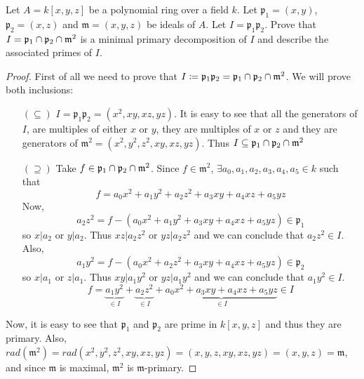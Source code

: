 \begin{problem}
    Let $A = k[x,y,z]$ be a polynomial ring over a field $k$.
    Let $\mathfrak{p}_1 = (x,y)$, $\mathfrak{p}_2 = (x,z)$ and $\mathfrak{m} = (x,y,z)$ be ideals of $A$.
    Let $I = \mathfrak{p}_1 \mathfrak{p}_2$.
    Prove that $I = \mathfrak{p}_1 \cap \mathfrak{p}_2 \cap \mathfrak{m}^2$ is a minimal primary decomposition of $I$ and describe the associated primes of $I$.
    \begin{sol}
        \begin{proof}
            First of all we need to prove that $I \coloneqq \mathfrak{p}_1 \mathfrak{p}_2 = \mathfrak{p}_1 \cap \mathfrak{p}_2 \cap \mathfrak{m}^2$.
            We will prove both inclusions:
            \begin{itemize}
                \item[$(\subseteq)$]
                $I = \mathfrak{p}_1 \mathfrak{p}_2 = (x^2, xy, xz, yz)$.
                It is easy to see that all the generators of $I$, are multiples of either $x$ or $y$, they are multiples of $x$ or $z$ and they are generators of $\mathfrak{m}^2 = (x^2, y^2, z^2, xy, xz, yz)$.
                Thus $I \subseteq \mathfrak{p}_1 \cap \mathfrak{p}_2 \cap \mathfrak{m}^2$
                \item[$(\supseteq)$]
                Take $f \in \mathfrak{p}_1 \cap \mathfrak{p}_2 \cap \mathfrak{m}^2$.
                Since $f \in \mathfrak{m}^2$, $\exists a_0, a_1, a_2, a_3, a_4, a_5 \in k$ such that
                \[ f = a_0 x^2 + a_1 y^2 + a_2 z^2 + a_3 xy + a_4 xz + a_5 yz \]
                Now,
                \[ a_2 z^2 = f - (a_0 x^2 + a_1 y^2 + a_3 xy + a_4 xz + a_5 yz) \in \mathfrak{p}_1 \]
                so $x | a_2$ or $y | a_2$.
                Thus $xz | a_2 z^2$ or $yz | a_2 z^2$ and we can conclude that $a_2 z^2 \in I$.
                Also,
                \[ a_1 y^2 = f - (a_0 x^2 + a_2 z^2 + a_3 xy + a_4 xz + a_5 yz) \in \mathfrak{p}_2 \]
                so $x | a_1$ or $z | a_1$.
                Thus $xy | a_1 y^2$ or $yz | a_1 y^2$ and we can conclude that $a_1 y^2 \in I$.
                \[ f = \underbrace{a_1 y^2}_{\in I} + \underbrace{a_2 z^2}_{\in I} + \underbrace{a_0 x^2 + a_3 xy + a_4 xz + a_5 yz}_{\in I} \in I \]
            \end{itemize}
            Now, it is easy to see that $\mathfrak{p}_1$ and $\mathfrak{p}_2$ are prime in $k[x,y,z]$ and thus they are primary.
            Also, $rad(\mathfrak{m}^2) = rad(x^2, y^2, z^2, xy, xz, yz) = (x,y,z,xy,xz,yz) = (x,y,z) = \mathfrak{m}$, and since $\mathfrak{m}$ is maximal, $\mathfrak{m}^2$ is $\mathfrak{m}$-primary.

\end{proof}
\end{sol}
\end{problem}
